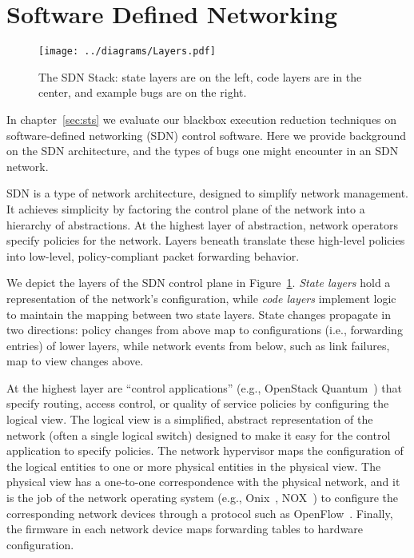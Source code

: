 \section{Software Defined Networking}
\label{sec:sdn}

\begin{figure}[ht!]
\centering
\texttt{[image: ../diagrams/Layers.pdf]}
\caption{The SDN Stack: state layers are on the left, code layers are in the center, and example bugs are on the right.}
\label{fig:layers}
\end{figure}

In chapter~\ref{sec:sts} we evaluate our blackbox execution reduction
techniques on
software-defined networking (SDN) control software.
Here we provide background on the SDN architecture, and the types of bugs one
might encounter in an SDN network.

SDN is a type of network architecture, designed to simplify network management. It
achieves simplicity by factoring the control plane of the network into a hierarchy of
abstractions. At the highest layer of abstraction, network operators specify
policies for the network. Layers beneath translate these high-level
policies into low-level, policy-compliant packet forwarding behavior.

We depict the layers of the SDN control plane in Figure~\ref{fig:layers}.  \emph{State layers} 
hold a representation of the network's configuration, while \emph{code layers} implement logic to maintain the mapping between two state layers. State changes propagate in two directions: policy changes from above map to configurations (i.e., forwarding entries) of lower layers, while network events from below, such as link failures, map to view changes above.

At the highest layer are ``control applications'' (e.g., OpenStack
                                                   Quantum~\cite{quantum})
that specify routing, access control, or quality of service policies by
configuring the logical view. The logical view is a simplified,
abstract representation of the network (often a single logical switch)
designed to make it easy for the control application to specify policies.
The network hypervisor maps the configuration of the logical entities to one
or more physical entities in the physical view. The physical view has a one-to-one
correspondence with the physical network, and it is the job of the network
operating system (e.g., Onix~\cite{onix}, NOX~\cite{nox}) to
configure the corresponding network devices through a protocol such as OpenFlow~\cite{openflow}.
Finally, the firmware in each network device maps forwarding tables to hardware configuration.

